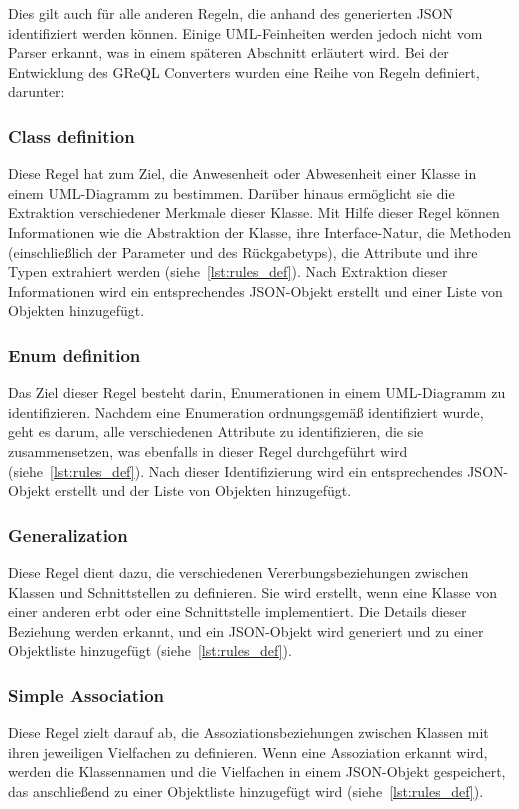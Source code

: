 Dies gilt auch für alle anderen Regeln, die anhand des generierten JSON identifiziert werden können. Einige
UML-Feinheiten werden jedoch nicht vom Parser erkannt, was in einem späteren Abschnitt erläutert wird. Bei der
Entwicklung des GReQL Converters wurden eine Reihe von Regeln definiert, darunter:

\subsubsection{Class definition}
Diese Regel hat zum Ziel, die Anwesenheit oder Abwesenheit einer Klasse in einem UML-Diagramm zu bestimmen. Darüber
hinaus ermöglicht sie die Extraktion verschiedener Merkmale dieser Klasse. Mit Hilfe dieser Regel können Informationen
wie die Abstraktion der Klasse, ihre Interface-Natur, die Methoden (einschließlich der Parameter und des Rückgabetyps),
die Attribute und ihre Typen extrahiert werden (siehe~\ref{lst:rules_def}). Nach Extraktion dieser Informationen wird
ein entsprechendes JSON-Objekt erstellt und einer Liste von Objekten hinzugefügt.

\subsubsection{Enum definition}
Das Ziel dieser Regel besteht darin, Enumerationen in einem UML-Diagramm zu identifizieren. Nachdem eine Enumeration
ordnungsgemäß identifiziert wurde, geht es darum, alle verschiedenen Attribute zu identifizieren, die sie zusammensetzen,
was ebenfalls in dieser Regel durchgeführt wird (siehe~\ref{lst:rules_def}). Nach dieser Identifizierung wird ein
entsprechendes JSON-Objekt erstellt und der Liste von Objekten hinzugefügt.

\subsubsection{Generalization}
Diese Regel dient dazu, die verschiedenen Vererbungsbeziehungen zwischen Klassen und Schnittstellen zu definieren.
Sie wird erstellt, wenn eine Klasse von einer anderen erbt oder eine Schnittstelle implementiert. Die Details dieser
Beziehung werden erkannt, und ein JSON-Objekt wird generiert und zu einer Objektliste hinzugefügt (siehe~\ref{lst:rules_def}).

\subsubsection{Simple Association}
Diese Regel zielt darauf ab, die Assoziationsbeziehungen zwischen Klassen mit ihren jeweiligen Vielfachen zu definieren.
Wenn eine Assoziation erkannt wird, werden die Klassennamen und die Vielfachen in einem JSON-Objekt gespeichert, das
anschließend zu einer Objektliste hinzugefügt wird (siehe~\ref{lst:rules_def}).

